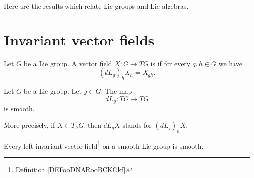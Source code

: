 
Here are the results which relate Lie groups and Lie algebras.

\section{Invariant vector fields}

\begin{definition}	\label{DEFooDNARooBCKCkf}
	Let \( G\) be a Lie group. A vector field \(X \colon G\to TG  \) is  if for every \( g,h\in G\) we have
	\begin{equation}
		(dL_g)_hX_h=X_{gh}.
	\end{equation}
\end{definition}

\begin{proposition}	\label{PROPooNAKSooYajsZZ}
	Let \( G\) be a Lie group. Let \( g\in G\). The map
	\begin{equation}
		dL_g \colon TG\to TG
	\end{equation}
	is smooth.

	More precisely, if \( X\in T_hG\), then \( dL_gX\) stands for \( (dL_g)_hX\).
\end{proposition}


\begin{proposition}	\label{PROPooYSIYooYptWWo}
	Every left invariant vector field\footnote{Definition \ref{DEFooDNARooBCKCkf}.} on a smooth Lie group is smooth.
\end{proposition}

